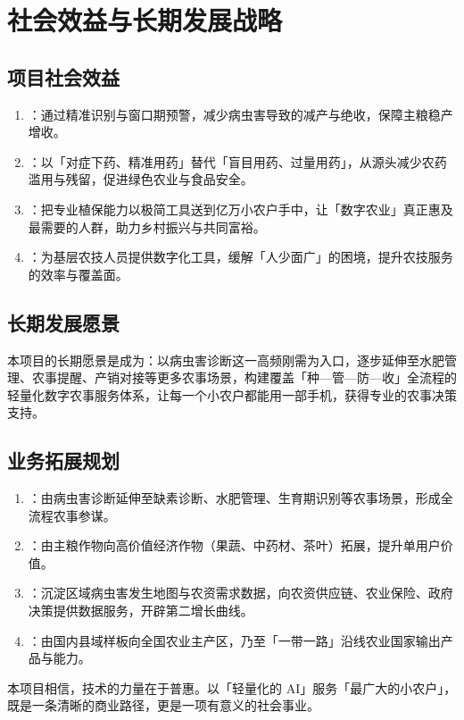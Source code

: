 \chapter{社会效益与长期发展战略}

\section{项目社会效益}

\begin{enumerate}[leftmargin=1.6em]
  \item {}：通过精准识别与窗口期预警，减少病虫害导致的减产与绝收，保障主粮稳产增收。
  \item {}：以「对症下药、精准用药」替代「盲目用药、过量用药」，从源头减少农药滥用与残留，促进绿色农业与食品安全。
  \item {}：把专业植保能力以极简工具送到亿万小农户手中，让「数字农业」真正惠及最需要的人群，助力乡村振兴与共同富裕。
  \item {}：为基层农技人员提供数字化工具，缓解「人少面广」的困境，提升农技服务的效率与覆盖面。
\end{enumerate}

\section{长期发展愿景}

本项目的长期愿景是成为：以病虫害诊断这一高频刚需为入口，逐步延伸至水肥管理、农事提醒、产销对接等更多农事场景，构建覆盖「种—管—防—收」全流程的轻量化数字农事服务体系，让每一个小农户都能用一部手机，获得专业的农事决策支持。

\section{业务拓展规划}

\begin{enumerate}[leftmargin=1.6em]
  \item {}：由病虫害诊断延伸至缺素诊断、水肥管理、生育期识别等农事场景，形成全流程农事参谋。
  \item {}：由主粮作物向高价值经济作物（果蔬、中药材、茶叶）拓展，提升单用户价值。
  \item {}：沉淀区域病虫害发生地图与农资需求数据，向农资供应链、农业保险、政府决策提供数据服务，开辟第二增长曲线。
  \item {}：由国内县域样板向全国农业主产区，乃至「一带一路」沿线农业国家输出产品与能力。
\end{enumerate}

本项目相信，技术的力量在于普惠。以「轻量化的 AI」服务「最广大的小农户」，既是一条清晰的商业路径，更是一项有意义的社会事业。
